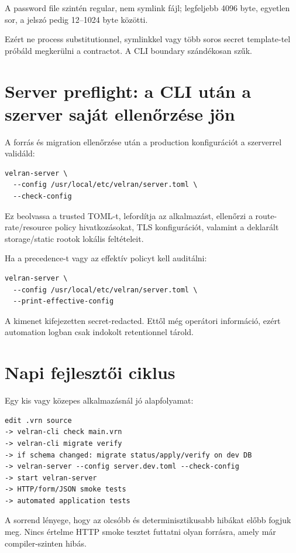A password file szintén regular, nem symlink fájl; legfeljebb 4096 byte, egyetlen sor, a jelszó pedig 12--1024 byte közötti.

Ezért ne process substitutionnel, symlinkkel vagy több soros secret template-tel próbáld megkerülni a contractot. A CLI boundary szándékosan szűk.

\section{Server preflight: a CLI után a szerver saját ellenőrzése jön}

A forrás és migration ellenőrzése után a production konfigurációt a szerverrel validáld:

\begin{lstlisting}
velran-server \
  --config /usr/local/etc/velran/server.toml \
  --check-config
\end{lstlisting}

Ez beolvassa a trusted TOML-t, lefordítja az alkalmazást, ellenőrzi a route-rate/resource policy hivatkozásokat, TLS konfigurációt, valamint a deklarált storage/static rootok lokális feltételeit.

Ha a precedence-t vagy az effektív policyt kell auditálni:

\begin{lstlisting}
velran-server \
  --config /usr/local/etc/velran/server.toml \
  --print-effective-config
\end{lstlisting}

A kimenet kifejezetten secret-redacted. Ettől még operátori információ, ezért automation logban csak indokolt retentionnel tárold.

\section{Napi fejlesztői ciklus}

Egy kis vagy közepes alkalmazásnál jó alapfolyamat:

\begin{lstlisting}
edit .vrn source
-> velran-cli check main.vrn
-> velran-cli migrate verify
-> if schema changed: migrate status/apply/verify on dev DB
-> velran-server --config server.dev.toml --check-config
-> start velran-server
-> HTTP/form/JSON smoke tests
-> automated application tests
\end{lstlisting}

A sorrend lényege, hogy az olcsóbb és determinisztikusabb hibákat előbb fogjuk meg. Nincs értelme HTTP smoke tesztet futtatni olyan forrásra, amely már compiler-szinten hibás.

